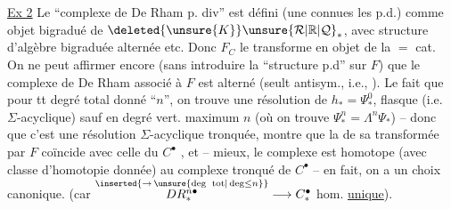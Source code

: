 \uline{Ex 2} \quad Le ``complexe de De Rham  p. div''
est défini   (une 
connues les p.d.) comme 
objet bigradué de $\deleted{\unsure{K}}\unsure{\mathcal R|\mathbb R|\mathcal Q}_{*}$, avec
structure d'algèbre bigraduée alternée
etc. Donc $F_C$ le transforme en
objet de la $=$ cat. On ne peut
affirmer encore (sans introduire
la ``structure p.d'' sur $F$) que
le complexe de De Rham associé à $F$
est alterné (seult antisym., i.e.,
). Le fait que
pour tt degré total donné ``$n$'', on trouve
une résolution de $h_*=\Psi_*^0$, flasque
(i.e. $\Sigma$-acyclique) sauf en degré
vert. maximum $n$ (où on trouve $\Psi_*^n
=\Lambda^n\Psi_*$) -- donc que c'est une résolution
$\Sigma$-acyclique tronquée, montre que
la  de sa transformée par $F$
coïncide avec celle du $C^\bullet$ , et
 -- mieux,
le complexe est homotope (avec
classe d'homotopie donnée) au
complexe tronqué  de $C^\bullet$ --
en fait, on a un choix canonique.
(car $\overset{\inserted{\to\,\unsure{\deg\ \mathrm{tot}|\deg\leq n}}}{DR_*^{n\bullet}}\longrightarrow C^\bullet_*$ hom. \uline{unique}).

